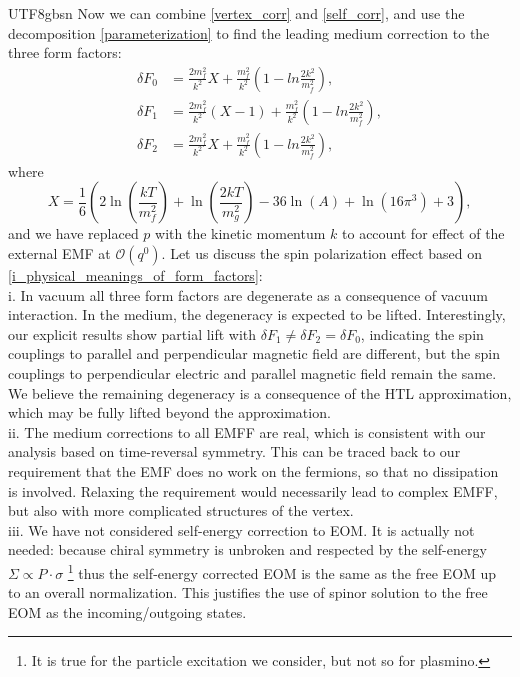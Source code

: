 \documentclass[11pt]{article}\def\baselinestretch{1.4}
\def\d{{\delta}}
\def\s{{\sigma}}
\def\S{{\Sigma}}
\begin{document}
\begin{CJK}{UTF8}{gbsn}
Now we can combine \eqref{vertex_corr} and \eqref{self_corr}, and use the decomposition \eqref{parameterization} to find the leading medium correction to the three form factors:
\begin{align}
\delta F_0 &= \frac{2m_f^2}{k^2}X+\frac{m_f^2}{k^2}\left( 1-ln\frac{2k^2}{m_f^2} \right), \label{delta_F_0}\\
\delta F_1 &= \frac{2m_f^2}{k^2}(X-1)+\frac{m_f^2}{k^2}\left( 1-ln\frac{2k^2}{m_f^2} \right), \label{delta_F_1}\\
\delta F_2 &= \frac{2m_f^2}{k^2}X+\frac{m_f^2}{k^2}\left( 1-ln\frac{2k^2}{m_f^2} \right), \label{delta_F_2}
\end{align}
where $$X=\frac{1}{6}\left(2 \ln \left(\frac{kT}{m_f^2}\right)+\ln \left(\frac{2 kT}{m_{g}^2}\right)-36 \ln (A)+\ln \left(16 \pi ^3 \right)+3\right),$$
and we have replaced $p$ with the kinetic momentum $k$ to account for effect of the external EMF at $\mathcal{O}(q^0)$.
%
Let us discuss the spin polarization effect based on \eqref{i_physical_meanings_of_form_factors}:\\
%
i. In vacuum all three form factors are degenerate as a consequence of vacuum interaction. In the medium, the degeneracy is expected to be lifted. Interestingly, our explicit results show partial lift with $\d F_1\ne\d F_2=\d F_0$, indicating the spin couplings to parallel and perpendicular magnetic field are different, but the spin couplings to perpendicular electric and parallel magnetic field remain the same. We believe the remaining degeneracy is a consequence of the HTL approximation, which may be fully lifted beyond the approximation.\\
%
ii. The medium corrections to all EMFF are real, which is consistent with our analysis based on time-reversal symmetry. This can be traced back to our requirement that the EMF does no work on the fermions, so that no dissipation is involved. Relaxing the requirement would necessarily lead to complex EMFF, but also with more complicated structures of the vertex.\\
%
iii. We have not considered self-energy correction to EOM. It is actually not needed: because chiral symmetry is unbroken and respected by the self-energy $\S\propto P\cdot \s$ \footnote{It is true for the particle excitation we consider, but not so for plasmino.} thus the self-energy corrected EOM is the same as the free EOM up to an overall normalization. This justifies the use of spinor solution to the free EOM as the incoming/outgoing states.




\end{CJK}
\end{document}
